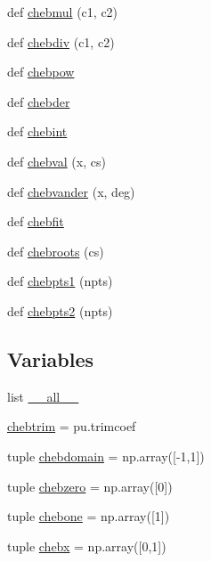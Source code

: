 \begin{DoxyCompactItemize}
\item 
def \hyperlink{namespacepyneb_1_1utils_1_1chebyshev_aca5aab8be2c47559d4489fd1dac11f75}{chebmul} (c1, c2)
\item 
def \hyperlink{namespacepyneb_1_1utils_1_1chebyshev_aa84df28815f29342a7cdce9b95470f02}{chebdiv} (c1, c2)
\item 
def \hyperlink{namespacepyneb_1_1utils_1_1chebyshev_ab647ff3aa7750a09b934b98cddd4c90d}{chebpow}
\item 
def \hyperlink{namespacepyneb_1_1utils_1_1chebyshev_a1ed2b9248c247449584904025ec9d460}{chebder}
\item 
def \hyperlink{namespacepyneb_1_1utils_1_1chebyshev_a233e686a07b9935c74ce1e053f0c5f5f}{chebint}
\item 
def \hyperlink{namespacepyneb_1_1utils_1_1chebyshev_a7f7442e9a3a00e1ca04a2283877b15a8}{chebval} (x, cs)
\item 
def \hyperlink{namespacepyneb_1_1utils_1_1chebyshev_aa9deae857486c8ee69362ded985b09d8}{chebvander} (x, deg)
\item 
def \hyperlink{namespacepyneb_1_1utils_1_1chebyshev_a6bb5eb95525fd0572aea52fcd2a12c6c}{chebfit}
\item 
def \hyperlink{namespacepyneb_1_1utils_1_1chebyshev_a2f01a14e36b415a2f3ebc67c95cceb26}{chebroots} (cs)
\item 
def \hyperlink{namespacepyneb_1_1utils_1_1chebyshev_a5ac57e95809a1f627400a7c3a34606f7}{chebpts1} (npts)
\item 
def \hyperlink{namespacepyneb_1_1utils_1_1chebyshev_a224bc370de0cfa204c3ac15d626d13e3}{chebpts2} (npts)
\end{DoxyCompactItemize}
\subsection*{Variables}
\begin{DoxyCompactItemize}
\item 
list \hyperlink{namespacepyneb_1_1utils_1_1chebyshev_a9cb4e1ba55fc61d6dd46d5c6f534edbc}{\+\_\+\+\_\+all\+\_\+\+\_\+}
\item 
\hyperlink{namespacepyneb_1_1utils_1_1chebyshev_a66b8c25023851573f25dc418071de82b}{chebtrim} = pu.\+trimcoef
\item 
tuple \hyperlink{namespacepyneb_1_1utils_1_1chebyshev_a57e110567544748d0de429d3743d1241}{chebdomain} = np.\+array(\mbox{[}-\/1,1\mbox{]})
\item 
tuple \hyperlink{namespacepyneb_1_1utils_1_1chebyshev_ad707fa9ec865920c2d8eedf6dfedf21c}{chebzero} = np.\+array(\mbox{[}0\mbox{]})
\item 
tuple \hyperlink{namespacepyneb_1_1utils_1_1chebyshev_a26a6cedd505a161858435461e1645503}{chebone} = np.\+array(\mbox{[}1\mbox{]})
\item 
tuple \hyperlink{namespacepyneb_1_1utils_1_1chebyshev_a00f984b78341cd7920c46d1a6acacc5f}{chebx} = np.\+array(\mbox{[}0,1\mbox{]})
\end{DoxyCompactItemize}


